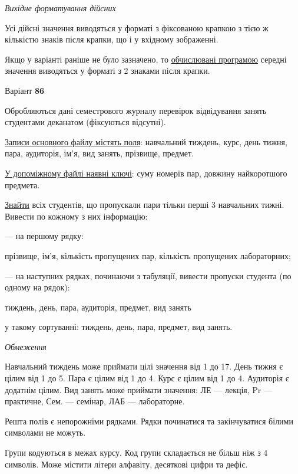 \documentclass[11pt, ukrainian]{article}
\begin{document}
\textit{Вихідне форматування дійсних}

Усі дійсні значення виводяться у форматі з фіксованою крапкою з тією ж кількістю знаків після крапки, що і у вхідному зображенні.

Якщо у варіанті раніше не було зазначено, то \underline{обчислювані програмою} середні значення виводяться у форматі з 2 знаками після крапки.




\par
\newpage
{\center Варіант  \No \textbf { 86 }\par}
\bigskip
Обробляються дані семестрового журналу перевірок відвідування занять студентами деканатом (фіксуються відсутні). 

\underline{Записи основного файлу містять поля}: навчальний тиждень, курс, день тижня, пара, аудиторія, ім’я, вид занять, прізвище, предмет.

\underline{У допоміжному файлі наявні ключі}: суму номерів пар, довжину найкоротшого предмета.

\underline{Знайти} всіх студентів, що пропускали пари тільки перші 3 навчальних тижні. Вивести по кожному з них інформацію:\par
{\noindent}--- на першому рядку:\par
прізвище, ім’я, кількість пропущених пар, кількість пропущених лабораторних;

{\noindent}--- на наступних рядках, починаючи з табуляції, вивести пропуски студента (по одному на рядок):\par
тиждень, день, пара, аудиторія, предмет, вид занять

{\noindent}у такому сортуванні: тиждень, день, пара, предмет, вид занять.


\bigskip\textit{Обмеження}

Навчальний тиждень може приймати цілі значення від 1 до 17.
День тижня є цілим від 1 до 5. Пара є цілим від 1 до 4.
Курс є цілим від 1 до 4. Аудиторія є додатнім цілим.
Вид занять може приймати значення:
ЛЕ --- лекція, Pr --- практичне, Сем. --- семінар, ЛАБ --- лабораторне.

Решта полів є непорожніми рядками.
Рядки починатися та закінчуватися білими символами не можуть.

Групи кодуються в межах курсу.
Код групи складається не більш ніж з 4 символів.
Може містити літери алфавіту, десяткові цифри та дефіс.
\end{document}
